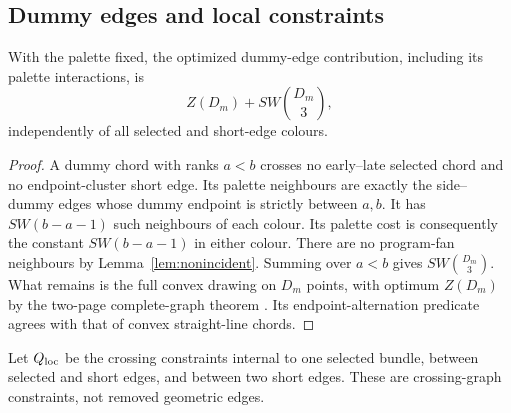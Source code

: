 \subsection{Dummy edges and local constraints}
\begin{lemma}\label{lem:dummy}
With the palette fixed, the optimized dummy-edge contribution, including its palette interactions, is
\begin{equation}\label{eq:dummy}
Z(D_m)+SW\binom{D_m}{3},
\end{equation}
independently of all selected and short-edge colours.
\end{lemma}
\begin{proof}
A dummy chord with ranks $a<b$ crosses no early--late selected chord and no endpoint-cluster short edge. Its palette neighbours are exactly the side--dummy edges whose dummy endpoint is strictly between $a,b$. It has $SW(b-a-1)$ such neighbours of each colour. Its palette cost is consequently the constant $SW(b-a-1)$ in either colour. There are no program-fan neighbours by Lemma~\ref{lem:nonincident}. Summing over $a<b$ gives $SW\binom{D_m}{3}$. What remains is the full convex drawing on $D_m$ points, with optimum $Z(D_m)$ by the two-page complete-graph theorem \cite{Abrego2013}. Its endpoint-alternation predicate agrees with that of convex straight-line chords.
\end{proof}

Let $Q_{\rm loc}$ be the crossing constraints internal to one selected bundle, between selected and short edges, and between two short edges. These are crossing-graph constraints, not removed geometric edges.

